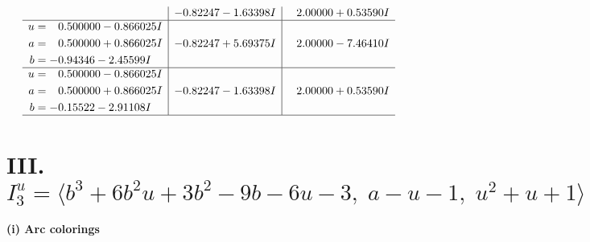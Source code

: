 \documentclass[1p]{elsarticle_modified}
\theoremstyle{definition}
\begin{document}
$$\begin{array}{c|c|c}
 & -0.82247 - 1.63398 I & \phantom{-}2.00000 + 0.53590 I \\ \hline\begin{aligned}
u &= \phantom{-}0.500000 - 0.866025 I \\
a &= \phantom{-}0.500000 + 0.866025 I \\
b &= -0.94346 - 2.45599 I\end{aligned}
 & -0.82247 + 5.69375 I & \phantom{-}2.00000 - 7.46410 I \\ \hline\begin{aligned}
u &= \phantom{-}0.500000 - 0.866025 I \\
a &= \phantom{-}0.500000 + 0.866025 I \\
b &= -0.15522 - 2.91108 I\end{aligned}
 & -0.82247 - 1.63398 I & \phantom{-}2.00000 + 0.53590 I\\
 \hline 
 \end{array}$$\newpage\newpage\renewcommand{\arraystretch}{1}
\centering \section*{III. $I^u_{3}= \langle b^3+6 b^2 u+3 b^2-9 b-6 u-3,\;a- u-1,\;u^2+u+1 \rangle$}
\flushleft \textbf{(i) Arc colorings}\\
\end{document}
